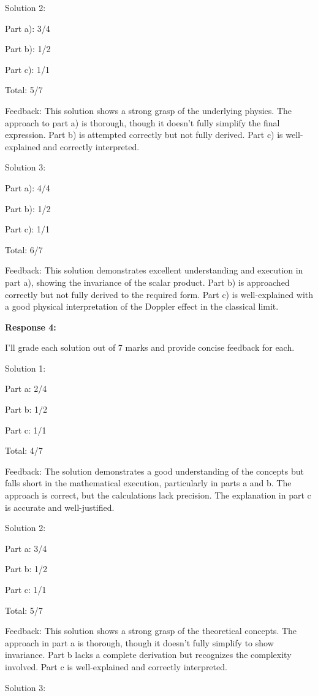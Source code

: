\documentclass[a4paper,11pt]{article}
\begin{document}
Solution 2:

Part a): 3/4

Part b): 1/2

Part c): 1/1

Total: 5/7

Feedback: This solution shows a strong grasp of the underlying physics. The approach to part a) is thorough, though it doesn't fully simplify the final expression. Part b) is attempted correctly but not fully derived. Part c) is well-explained and correctly interpreted.

Solution 3:

Part a): 4/4

Part b): 1/2

Part c): 1/1

Total: 6/7

Feedback: This solution demonstrates excellent understanding and execution in part a), showing the invariance of the scalar product. Part b) is approached correctly but not fully derived to the required form. Part c) is well-explained with a good physical interpretation of the Doppler effect in the classical limit.

\bigskip
\textbf{Response 4:}

I'll grade each solution out of 7 marks and provide concise feedback for each.

Solution 1:

Part a: 2/4

Part b: 1/2

Part c: 1/1

Total: 4/7

Feedback: The solution demonstrates a good understanding of the concepts but falls short in the mathematical execution, particularly in parts a and b. The approach is correct, but the calculations lack precision. The explanation in part c is accurate and well-justified.

Solution 2:

Part a: 3/4

Part b: 1/2

Part c: 1/1

Total: 5/7

Feedback: This solution shows a strong grasp of the theoretical concepts. The approach in part a is thorough, though it doesn't fully simplify to show invariance. Part b lacks a complete derivation but recognizes the complexity involved. Part c is well-explained and correctly interpreted.

Solution 3:
\end{document}
